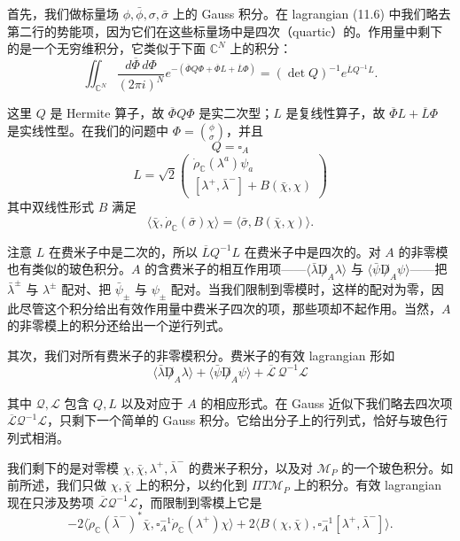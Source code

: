 首先，我们做标量场 $\phi,\bar\phi,\sigma,\bar\sigma$ 上的 Gauss 积分。在 lagrangian (11.6) 中我们略去第二行的势能项，因为它们在这些标量场中是四次（quartic）的。作用量中剩下的是一个无穷维积分，它类似于下面 $\mathbb{C}^N$ 上的积分：
\[
  \iint_{\mathbb{C}^N}\frac{d\overline{\Phi}\,d\Phi}{(2\pi i)^N}
  e^{-(\overline{\Phi}Q\Phi+\overline{\Phi}L+\overline{L}\Phi)}
  =(\det Q)^{-1}e^{\overline{L}Q^{-1}L}.
\]

这里 $Q$ 是 Hermite 算子，故 $\overline{\Phi}Q\Phi$ 是实二次型；$L$ 是复线性算子，故 $\overline{\Phi}L+\overline{L}\Phi$ 是实线性型。在我们的问题中 $\Phi=\binom{\phi}{\sigma}$，并且
\[
  Q=\square_A
\]
\[
  L=\sqrt2\begin{pmatrix}
    \dot\rho_{\mathbb{C}}(\lambda^a)\psi_a\\[2pt]
    [\lambda^+,\bar\lambda^-]+B(\bar\chi,\chi)
  \end{pmatrix}
\]
其中双线性形式 $B$ 满足
\begin{equation}
  \tag{11.11}
  \label{eq:sol11-11}
  \langle\bar\chi,\dot\rho_{\mathbb{C}}(\bar\sigma)\chi\rangle
  =\langle\bar\sigma,B(\bar\chi,\chi)\rangle.
\end{equation}

注意 $L$ 在费米子中是二次的，所以 $\overline{L}Q^{-1}L$ 在费米子中是四次的。对 $A$ 的非零模也有类似的玻色积分。$A$ 的含费米子的相互作用项——$\langle\bar\lambda\not D_A\lambda\rangle$ 与 $\langle\bar\psi\not D_A\psi\rangle$——把 $\bar\lambda^\pm$ 与 $\lambda^\pm$ 配对、把 $\bar\psi_\pm$ 与 $\psi_\pm$ 配对。当我们限制到零模时，这样的配对为零，因此尽管这个积分给出有效作用量中费米子四次的项，那些项却不起作用。当然，$A$ 的非零模上的积分还给出一个逆行列式。

其次，我们对所有费米子的非零模积分。费米子的有效 lagrangian 形如
\[
  \langle\bar\lambda\not D_A\lambda\rangle+\langle\bar\psi\not D_A\psi\rangle
  +\overline{\mathcal{L}}\,\mathcal{Q}^{-1}\mathcal{L}
\]

其中 $\mathcal{Q},\mathcal{L}$ 包含 $Q,L$ 以及对应于 $A$ 的相应形式。在 Gauss 近似下我们略去四次项 $\overline{\mathcal{L}}\mathcal{Q}^{-1}\mathcal{L}$，只剩下一个简单的 Gauss 积分。它给出分子上的行列式，恰好与玻色行列式相消。

我们剩下的是对零模 $\chi,\bar\chi,\lambda^+,\bar\lambda^-$ 的费米子积分，以及对 $\mathcal{M}_P$ 的一个玻色积分。如前所述，我们只做 $\chi,\bar\chi$ 上的积分，以约化到 $\Pi T\mathcal{M}_P$ 上的积分。有效 lagrangian 现在只涉及势项 $\overline{\mathcal{L}}\mathcal{Q}^{-1}\mathcal{L}$，而限制到零模上它是
\[
  -2\bigl\langle\dot\rho_{\mathbb{C}}(\bar\lambda^-)^*\bar\chi,\square_A^{-1}\dot\rho_{\mathbb{C}}(\lambda^+)\chi\bigr\rangle
  +2\bigl\langle B(\chi,\bar\chi),\square_A^{-1}[\lambda^+,\bar\lambda^-]\bigr\rangle.
\]

